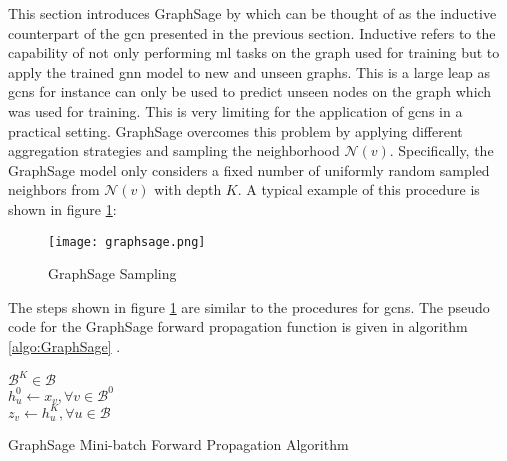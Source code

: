	\noindent This section introduces GraphSage by \cite{hamilton2017inductive} 
	which can be thought of as the inductive counterpart of the \acs{gcn} 
	presented in the previous section. Inductive refers to the capability of 
	not only performing \acs{ml} tasks on the graph used for training but to 
	apply the trained \acs{gnn} model to new and unseen graphs. This is a large 
	leap as \acsp{gcn} for instance can only be used to predict unseen nodes on 
	the graph which was used for training. This is very limiting for the 
	application of \acsp{gcn} in a practical setting. GraphSage overcomes this
	problem by applying different aggregation strategies and sampling the 
	neighborhood $\mathcal{N}(v)$. Specifically, the GraphSage model only 
	considers a fixed number of uniformly random sampled neighbors from 
	$\mathcal{N}(v)$ with depth $K$. A typical example of this procedure is 
	shown in figure \ref{fig:GraphSage_sample}:

	\begin{figure}[h]
		\centering
		\texttt{[image: graphsage.png]}
		\caption{GraphSage Sampling}
		\cite[p. 2]{hamilton2017inductive}
		\label{fig:GraphSage_sample}
	\end{figure}

	\noindent The steps shown in figure \ref{fig:GraphSage_sample} are similar
	to the procedures for \acsp{gcn}. The pseudo code for the GraphSage forward 
	propagation function is given in algorithm \ref{algo:GraphSage} 
	\cite[p. 12]{hamilton2017inductive}. \\


	\begin{algorithm}[h]
		\scriptsize
		\SetAlgoLined
		\nl $\mathcal{B}^{K}\in\mathcal{B}$\\
		\nl {}
		\nl $h_{u}^{0}\leftarrow x_{v},\forall v \in \mathcal{B}^{0}$\\
		\nl {}
		\nl $z_v \leftarrow h_{u}^{K},\forall u \in \mathcal{B}$
		\caption{GraphSage Mini-batch Forward Propagation Algorithm}
		\label{algo:GraphSage}
	\end{algorithm}
	
